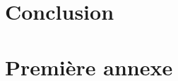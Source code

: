 \documentclass[11pt,a4paper]{article}
\numberwithin{equation}{section}
\begin{document}




\newpage
\section*{Conclusion}


\newpage
\appendix
\section{Première annexe} \label{annexe_fonctionnelles}


\newpage

 
\end{document}
